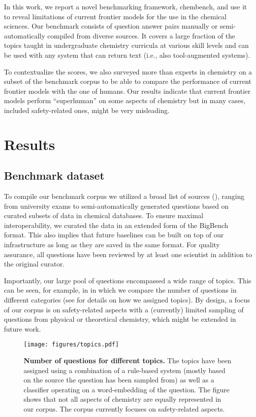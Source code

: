 \documentclass[11pt, oneside]{article}
\begin{document}
In this work, we report a novel benchmarking framework, chembench, and use it to reveal limitations of current frontier models for the use in the chemical sciences.
Our benchmark consists of  question answer pairs manually or semi-automatically compiled from diverse sources. 
It covers a large fraction of the topics taught in undergraduate chemistry curricula at various skill levels and can be used with any system that can return text (i.e., also tool-augmented systems).

To contextualize the scores, we also surveyed more than  experts in chemistry on a subset of the benchmark corpus to be able to compare the performance of current frontier models with the one of humans.
Our results indicate that current frontier models perform \enquote{superhuman} on some aspects of chemistry but in many cases, included safety-related ones, might be very misleading. 


\section{Results}

\subsection{Benchmark dataset}

To compile our benchmark corpus we utilized a broad list of sources (), ranging from university exams to semi-automatically generated questions based on curated subsets of data in chemical databases. 
To ensure maximal interoperability, we curated the data in an extended form of the BigBench format. This also implies that future baselines can be built on top of our infrastructure as long as they are saved in the same format. 
For quality assurance, all questions have been reviewed by at least one scientist in addition to the original curator.

Importantly, our large pool of questions encompassed a wide range of topics. This can be seen, for example, in  in which we compare the number of questions in different categories (see  for details on how we assigned topics). 
By design, a focus of our corpus is on safety-related aspects with a (currently) limited sampling of questions from physical or theoretical chemistry, which might be extended in future work.

\begin{figure}
    \centering
    \texttt{[image: figures/topics.pdf]}
    \caption{\textbf{Number of questions for different topics.} The topics have been assigned using a combination of a rule-based system (mostly based on the source the question has been sampled from) as well as a classifier operating on a word-embedding of the question. The figure shows that not all aspects of chemistry are equally represented in our corpus. The corpus currently focuses on safety-related aspects.}
    \label{fig:topic_barplot}
\end{figure}
\end{document}

